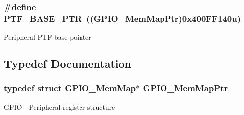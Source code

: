 \subsubsection[{P\+T\+F\+\_\+\+B\+A\+S\+E\+\_\+\+P\+T\+R}]{\setlength{\rightskip}{0pt plus 5cm}\#define P\+T\+F\+\_\+\+B\+A\+S\+E\+\_\+\+P\+T\+R~(({\bf G\+P\+I\+O\+\_\+\+Mem\+Map\+Ptr})0x400\+F\+F140u)}\label{group___g_p_i_o___peripheral_ga77d3c9297d0f81182ffcc68c0096eb1a}
Peripheral P\+T\+F base pointer 

\subsection{Typedef Documentation}
\hypertarget{group___g_p_i_o___peripheral_ga31c1eddda45aa085f51142987e05ada5}{}
\subsubsection[{G\+P\+I\+O\+\_\+\+Mem\+Map\+Ptr}]{\setlength{\rightskip}{0pt plus 5cm}typedef struct {\bf G\+P\+I\+O\+\_\+\+Mem\+Map}$\ast$ {\bf G\+P\+I\+O\+\_\+\+Mem\+Map\+Ptr}}\label{group___g_p_i_o___peripheral_ga31c1eddda45aa085f51142987e05ada5}
G\+P\+I\+O -\/ Peripheral register structure 